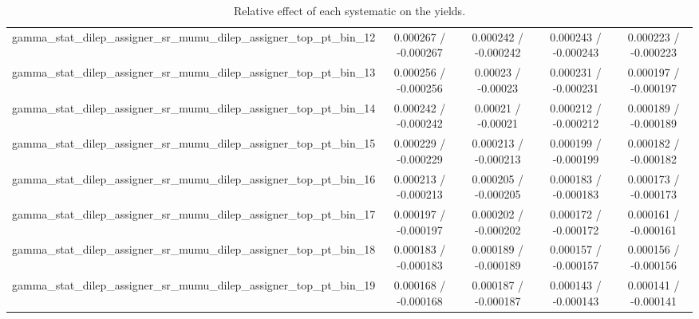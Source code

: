 \documentclass[10pt]{article}
\begin{document}
\begin{table}[htbp]
\begin{center}
\begin{tabular}{|c|c|c|c|c|}
  gamma_stat_dilep_assigner_sr_mumu_dilep_assigner_top_pt_bin_12 & 0.000267 / -0.000267 & 0.000242 / -0.000242 & 0.000243 / -0.000243 & 0.000223 / -0.000223 \\ 
  gamma_stat_dilep_assigner_sr_mumu_dilep_assigner_top_pt_bin_13 & 0.000256 / -0.000256 & 0.00023 / -0.00023 & 0.000231 / -0.000231 & 0.000197 / -0.000197 \\ 
  gamma_stat_dilep_assigner_sr_mumu_dilep_assigner_top_pt_bin_14 & 0.000242 / -0.000242 & 0.00021 / -0.00021 & 0.000212 / -0.000212 & 0.000189 / -0.000189 \\ 
  gamma_stat_dilep_assigner_sr_mumu_dilep_assigner_top_pt_bin_15 & 0.000229 / -0.000229 & 0.000213 / -0.000213 & 0.000199 / -0.000199 & 0.000182 / -0.000182 \\ 
  gamma_stat_dilep_assigner_sr_mumu_dilep_assigner_top_pt_bin_16 & 0.000213 / -0.000213 & 0.000205 / -0.000205 & 0.000183 / -0.000183 & 0.000173 / -0.000173 \\ 
  gamma_stat_dilep_assigner_sr_mumu_dilep_assigner_top_pt_bin_17 & 0.000197 / -0.000197 & 0.000202 / -0.000202 & 0.000172 / -0.000172 & 0.000161 / -0.000161 \\ 
  gamma_stat_dilep_assigner_sr_mumu_dilep_assigner_top_pt_bin_18 & 0.000183 / -0.000183 & 0.000189 / -0.000189 & 0.000157 / -0.000157 & 0.000156 / -0.000156 \\ 
  gamma_stat_dilep_assigner_sr_mumu_dilep_assigner_top_pt_bin_19 & 0.000168 / -0.000168 & 0.000187 / -0.000187 & 0.000143 / -0.000143 & 0.000141 / -0.000141 \\ 
\hline 
\end{tabular} 
\caption{Relative effect of each systematic on the yields.} 
\end{center} 
\end{table} 
\end{document}
